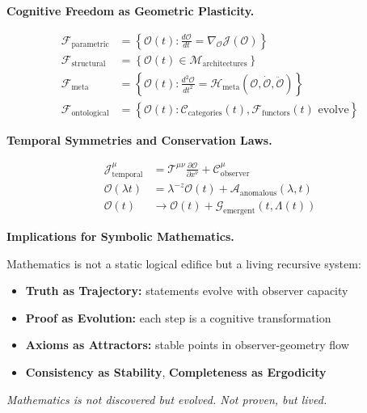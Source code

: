 \begin{scholium}
\vspace{1em}
\noindent\textbf{Cognitive Freedom as Geometric Plasticity.}

\begin{align*}
\mathcal{F}_{\text{parametric}} &= \left\{ \mathcal{O}(t) : \frac{d\mathcal{O}}{dt} = \nabla_{\mathcal{O}} \mathcal{J}(\mathcal{O}) \right\} \\
\mathcal{F}_{\text{structural}} &= \left\{ \mathcal{O}(t) \in \mathcal{M}_{\text{architectures}} \right\} \\
\mathcal{F}_{\text{meta}} &= \left\{ \mathcal{O}(t) : \frac{d^2\mathcal{O}}{dt^2} = \mathcal{H}_{\text{meta}}(\mathcal{O}, \dot{\mathcal{O}}, \ddot{\mathcal{O}}) \right\} \\
\mathcal{F}_{\text{ontological}} &= \left\{ \mathcal{O}(t) : \mathcal{C}_{\text{categories}}(t), \mathcal{F}_{\text{functors}}(t) \text{ evolve} \right\}
\end{align*}

\vspace{1em}
\noindent\textbf{Temporal Symmetries and Conservation Laws.}

\begin{align*}
\mathcal{J}_{\text{temporal}}^\mu &= \mathcal{T}^{\mu\nu} \frac{\partial \mathcal{O}}{\partial x^\nu} + \mathcal{C}_{\text{observer}}^\mu \\
\mathcal{O}(\lambda t) &= \lambda^{-z} \mathcal{O}(t) + \mathcal{A}_{\text{anomalous}}(\lambda, t) \\
\mathcal{O}(t) &\rightarrow \mathcal{O}(t) + \mathcal{G}_{\text{emergent}}(t, \Lambda(t))
\end{align*}

\vspace{1em}
\noindent\textbf{Implications for Symbolic Mathematics.}

Mathematics is not a static logical edifice but a living recursive system:
\begin{itemize}
    \item \textbf{Truth as Trajectory:} statements evolve with observer capacity
    \item \textbf{Proof as Evolution:} each step is a cognitive transformation
    \item \textbf{Axioms as Attractors:} stable points in observer-geometry flow
    \item \textbf{Consistency as Stability}, \textbf{Completeness as Ergodicity}
\end{itemize}

\textit{Mathematics is not discovered but evolved. Not proven, but lived.}

\end{scholium}

